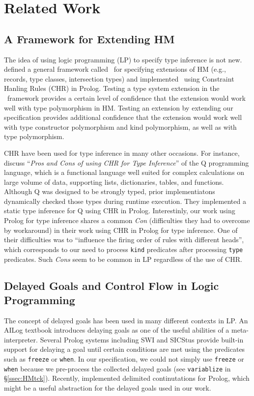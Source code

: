 \section{Related Work}\label{sec:relwork}
\subsection{A Framework for Extending HM}
The idea of using logic programming (LP) to specify type inference is not new.
\citet*{HMX99} defined a general framework called \HMX\ for specifying
extensions of HM (e.g., records, type classes, intersection types) and
\citet{tyinferCHR02} implemented \HMX\ using Constraint Hanling Rules (CHR)
in Prolog. Testing a type system extension in the \HMX\ framework provides
a certain level of confidence that the extension would work well with
type polymorphism in HM. Testing an extension by extending our specification
provides additional confidence that the extension would work well with
type constructor polymorphism and kind polymorphism, as well as
with type polymorphism.

CHR have been used for type inference in many other occasions.
For instance, \citet{CsorbaCHRforTyInf12} discuss
``\emph{Pros and Cons of using CHR for Type Inference}'' of the Q programming
language, which is a functional language well suited for complex calculations
on large volume of data, supporting lists, dictionaries, tables, and functions.
Although Q was designed to be strongly typed, prior implementiatons dynamically
checked those types during runtime execution. They implemented a static type
inference for Q using CHR in Prolog. Interestinly, our work using Prolog for
type inference shares a common \emph{Con} (difficulties they had to
overcome by workaround) in their work using CHR in Prolog for type inference.
One of their difficulties was to ``influence the firing order of rules
with different heads'', which corresponds to our need to process \texttt{kind}
predicates after processing \texttt{type} predicates. Such \emph{Cons} seem
to be common in LP regardless of the use of CHR.

\subsection{Delayed Goals and Control Flow in Logic Programming}
The concept of delayed goals has been used in many different contexts in LP.
An AILog
	 textbook \cite{AILogTextBook}
introduces delaying goals as one of the useful abilities of a meta-interpreter.
Several Prolog systems including SWI and SICStus provide built-in support for
delaying a goal until certain conditions are met using the predicates
such as {\small\verb|freeze|} or {\small\verb|when|}. In our specification,
we could not simply use {\small\verb|freeze|} or {\small\verb|when|}
because we pre-process the collected delayed goals (see \verb|variablize|
in \S\ref{ssec:HMtck}).
Recently, \citet{SchDemDesWei13} implemented delimited continutations for
Prolog, which might be a useful abstraction for the delayed goals 
used in our work.

